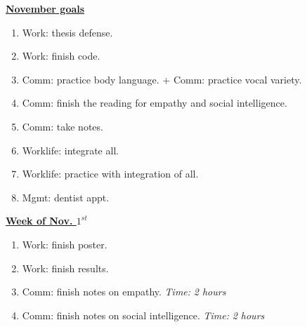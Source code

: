 \documentclass[serif, mathserif, final]{beamer}
\newcommand{\timeEst}[1]{\textit{Time:} \textit{#1}}
\begin{document}
{\begin{frame} {}
\begin{columns}
\begin{column}{0.27\linewidth}
\begin{block}{\underline{\textbf{November goals}}}
\begin{enumerate}
\item \small Work: thesis defense. 
\item \small Work: finish code. 
\item \small Comm: practice body language. + Comm: practice vocal variety. 
\item \small Comm: finish the reading for empathy and social intelligence. 
\item \small Comm: take notes. 
\item \small Worklife: integrate all. 
\item \small Worklife: practice with integration of all. 
\item \small Mgmt: dentist appt. 
\end{enumerate}
\end{block}

\begin{block}{\small \underline{\textbf{Week of Nov. $1^{st}$}}}
\begin{enumerate}
\tiny \item \tiny Work: finish poster. 
\item \tiny Work: finish results. 
\item \tiny Comm: finish notes on empathy. \timeEst{2 hours} 
\item \tiny Comm: finish notes on social intelligence. \timeEst{2 hours} 
\end{enumerate}
\end{block}


\end{column}
\end{columns}
\end{frame}}
\end{document}
